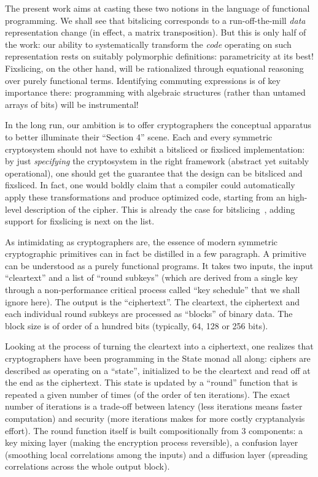 \documentclass[draft,english]{jflart}
\begin{document}
The present work aims at casting these two notions in the language of
functional programming. We shall see that bitslicing corresponds to a
run-off-the-mill \emph{data} representation change (in effect, a
matrix transposition). But this is only half of the work: our ability
to systematically transform the \emph{code} operating on such
representation rests on suitably polymorphic definitions:
parametricity at its best! Fixslicing, on the other hand, will be
rationalized through equational reasoning over purely functional
terms. Identifying commuting expressions is of key importance there:
programming with algebraic structures (rather than untamed arrays of
bits) will be instrumental!

In the long run, our ambition is to offer cryptographers the
conceptual apparatus to better illuminate their ``Section 4'' scene.
Each and every symmetric cryptosystem should not have to exhibit a
bitsliced or fixsliced implementation: by just \emph{specifying} the
cryptosystem in the right framework (abstract yet suitably
operational), one should get the guarantee that the design can be
bitsliced and fixsliced. In fact, one would boldly claim that a
compiler could automatically apply these transformations and produce
optimized code, starting from an high-level description of the cipher.
This is already the case for bitslicing~\citep{mercadier:PhD}, adding support
for fixslicing is next on the list.


As intimidating as cryptographers are, the essence of modern symmetric
cryptographic primitives can in fact be distilled in a few paragraph. A
primitive can be understood as a purely functional programs. It takes
two inputs, the input ``cleartext'' and a list of ``round subkeys''
(which are derived from a single key through a non-performance
critical process called ``key schedule'' that we shall ignore here).
The output is the ``ciphertext''. The cleartext, the ciphertext and
each individual round subkeys are processed as ``blocks'' of binary
data. The block size is of order of a hundred bits (typically, 64, 128
or 256 bits).

Looking at the process of turning the cleartext into a ciphertext, one
realizes that cryptographers have been programming in the State monad
all along: ciphers are described as operating on a ``state'',
initialized to be the cleartext and read off at the end as the
ciphertext. This state is updated by a ``round'' function that is
repeated a given number of times (of the order of ten iterations). The
exact number of iterations is a trade-off between latency (less
iterations means faster computation) and security (more iterations
makes for more costly cryptanalysis effort). The round function itself
is built compositionally from 3 components: a key mixing layer (making
the encryption process reversible), a confusion layer (smoothing local
correlations among the inputs) and a diffusion layer (spreading
correlations across the whole output block).
\end{document}
